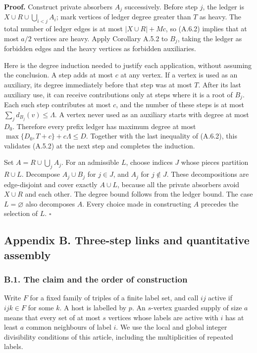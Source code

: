\documentclass[english,11pt,a4paper]{article}
\begin{document}
\textbf{Proof.} Construct private absorbers \(A_j\) successively. Before step \(j\), the ledger is \(X\cup R\cup\bigcup_{i<j}A_i\); mark vertices of ledger degree greater than \(T\) as heavy. The total number of ledger edges is at most \(|X\cup R|+Mc\), so (A.6.2) implies that at most \(a/2\) vertices are heavy. Apply Corollary A.5.2 to \(B_j\), taking the ledger as forbidden edges and the heavy vertices as forbidden auxiliaries.

Here is the degree induction needed to justify each application, without assuming the conclusion. A step adds at most \(c\) at any vertex. If a vertex is used as an auxiliary, its degree immediately before that step was at most \(T\). After its last auxiliary use, it can receive contributions only at steps where it is a root of \(B_j\). Each such step contributes at most \(c\), and the number of these steps is at most \(\sum_j d_{B_j}(v)\le\Lambda\). A vertex never used as an auxiliary starts with degree at most \(D_0\). Therefore every prefix ledger has maximum degree at most \(\max\{D_0,T+c\}+c\Lambda\le D\). Together with the last inequality of (A.6.2), this validates (A.5.2) at the next step and completes the induction.

Set \(A=R\cup\bigcup_j A_j\). For an admissible \(L\), choose indices \(J\) whose pieces partition \(R\cup L\). Decompose \(A_j\cup B_j\) for \(j\in J\), and \(A_j\) for \(j\notin J\). These decompositions are edge-disjoint and cover exactly \(A\cup L\), because all the private absorbers avoid \(X\cup R\) and each other. The degree bound follows from the ledger bound. The case \(L=\varnothing\) also decomposes \(A\). Every choice made in constructing \(A\) precedes the selection of \(L\). \(\square\)

\bigskip

\subsection{Appendix B. Three-step links and quantitative assembly}\label{appendix-b.-three-step-links-and-quantitative-assembly}

\subsubsection{B.1. The claim and the order of construction}\label{b.1.-the-claim-and-the-order-of-construction}

Write \(F\) for a fixed family of triples of a finite label set, and call \(ij\) active if \(ijk\in F\) for some \(k\). A host is labelled by \(p\). An \(s\)-vertex guarded supply of size \(a\) means that every set of at most \(s\) vertices whose labels are active with \(i\) has at least \(a\) common neighbours of label \(i\). We use the local and global integer divisibility conditions of this article, including the multiplicities of repeated labels.
\end{document}

